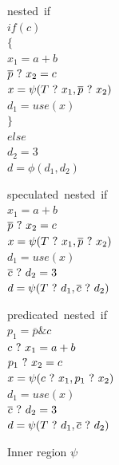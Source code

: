 \begin{figure}
\footnotesize
\begin{minipage}[t]{3.5cm}
\mbox{nested if} \\
$ if (c) $ \\
$ \{ $ \\
\hspace*{2mm}$ x_1 = a + b $ \\
\hspace*{2mm}$ \overline{p} ~?~ x_2 = c $ \\
\hspace*{2mm}$ x = \psi(T ~?~ x_1, \overline{p} ~?~ x_2) $ \\
\hspace*{2mm}$ d_1 = use (x) $ \\
$ \} $ \\
$ else $ \\
\hspace*{2mm}$ d_2 = 3 $ \\
$ d = \phi(d_1,d_2) $ \\
\label{nested_psi}
\end{minipage}
\begin{minipage}[t]{3.5cm}
\mbox{speculated nested if} \\
$ x_1 = a + b $ \\
$ \overline{p} ~?~ x_2 = c $ \\
$ x = \psi(T ~?~ x_1, \overline{p} ~?~ x_2) $ \\
$ d_1 = use (x) $ \\
$ \overline{c} ~?~ d_2 = 3 $ \\
$ d = \psi(T ~?~ d_1, \overline{c} ~?~ d_2) $ \\
\label{nested_psi_speculated}
\end{minipage}
\begin{minipage}[t]{3.5cm}
\mbox{predicated nested if} \\
$ p_1 = \overline{p} \& {c} $ \\
$ c ~?~ x_1 = a + b $ \\
$ p_1 ~?~ x_2 = c $ \\
$ x = \psi(c ~?~ x_1, p_1 ~?~ x_2) $ \\
$ d_1 = use (x) $ \\
$ \overline{c} ~?~ d_2 = 3 $ \\
$ d = \psi(T ~?~ d_1, \overline{c} ~?~ d_2) $ \\
\label{nested_psi_predicated}
\end{minipage}
\caption{Inner region $\psi$}
\end{figure}

